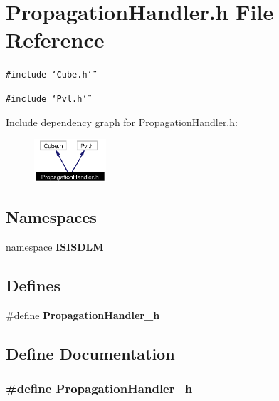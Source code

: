 \section{Propagation\-Handler.h File Reference}
\label{PropagationHandler_8h}
{\tt \#include \char`\"{}Cube.h\char`\"{}}\par
{\tt \#include \char`\"{}Pvl.h\char`\"{}}\par


Include dependency graph for Propagation\-Handler.h:\begin{figure}[H]
\begin{center}
\leavevmode
\includegraphics[width=76pt]{PropagationHandler_8h__incl}
\end{center}
\end{figure}
\subsection*{Namespaces}
\begin{CompactItemize}
\item 
namespace {\bf ISISDLM}
\end{CompactItemize}
\subsection*{Defines}
\begin{CompactItemize}
\item 
\#define {\bf Propagation\-Handler\_\-h}
\end{CompactItemize}


\subsection{Define Documentation}
\subsubsection{\setlength{\rightskip}{0pt plus 5cm}\#define Propagation\-Handler\_\-h}\label{PropagationHandler_8h_a0}


